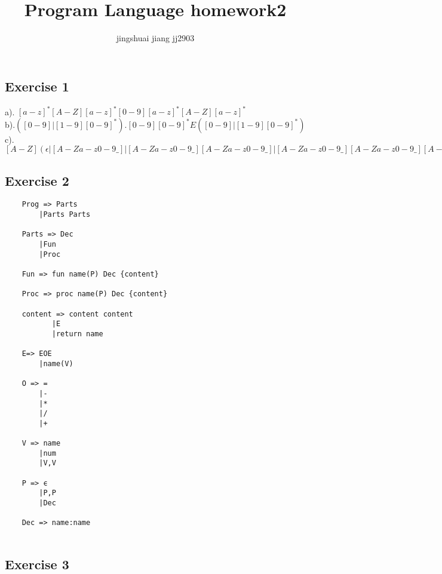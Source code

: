 \documentclass[12pt]{article}
\title{Program Language homework2}
\author{jingshuai jiang jj2903}
\begin{document}
\maketitle

\vspace{0.5in}



\subsection*{Exercise 1}

a). $[a-z]^*[A-Z][a-z]^*[0-9][a-z]^*[A-Z][a-z]^*$
\\[10pt]b).$([0-9]|[1-9][0-9]^*).[0-9][0-9]^*E([0-9]|[1-9][0-9]^*)$
\\[10pt]c).$[A-Z](\epsilon|[A-Za-z0-9\_]|[A-Za-z0-9\_][A-Za-z0-9\_]|[A-Za-z0-9\_][A-Za-z0-9\_][A-Za-z0-9\_]|[A-Za-z0-9\_][A-Za-z0-9\_][A-Za-z0-9\_][A-Za-z0-9\_]|[A-Za-z0-9\_][A-Za-z0-9\_][A-Za-z0-9\_][A-Za-z0-9\_][A-Za-z0-9\_]|[A-Za-z0-9\_][A-Za-z0-9\_][A-Za-z0-9\_][A-Za-z0-9\_][A-Za-z0-9\_][A-Za-z0-9\_])$




\subsection*{Exercise 2}
\begin{lstlisting}
    Prog => Parts
		|Parts Parts

    Parts => Dec
		|Fun
		|Proc

    Fun => fun name(P) Dec {content}

    Proc => proc name(P) Dec {content}

    content => content content
		   |E
		   |return name

    E=> EOE
	    |name(V)

    O => =
	    |-
	    |*
	    |/
	    |+

    V => name
	    |num
	    |V,V

    P => ϵ
	    |P,P
	    |Dec

    Dec => name:name
    
\end{lstlisting}


\clearpage
\subsection*{Exercise 3}
\end{document}
